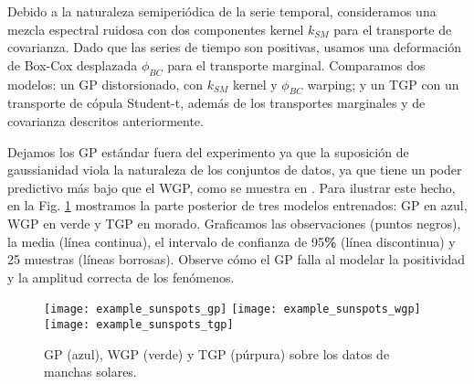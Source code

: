 Debido a la naturaleza semiperiódica de la serie temporal, consideramos una mezcla espectral ruidosa con dos componentes kernel \(k_{SM}\) \cite{wilson2013gaussian} para el transporte de covarianza. Dado que las series de tiempo son positivas, usamos una deformación de Box-Cox desplazada \(\phi_{BC}\) \cite{rios2018learning} para el transporte marginal. Comparamos dos modelos: un GP distorsionado, con \(k_{SM}\) kernel y \(\phi_{BC}\) warping; y un TGP con un transporte de cópula Student-t, además de los transportes marginales y de covarianza descritos anteriormente.

Dejamos los GP estándar fuera del experimento ya que la suposición de gaussianidad viola la naturaleza de los conjuntos de datos, ya que tiene un poder predictivo más bajo que el WGP, como se muestra en \cite{rios2018learning, riostobar2019cwgp}. Para ilustrar este hecho, en la Fig. \ref{fig_sunspots} mostramos la parte posterior de tres modelos entrenados: GP en azul, WGP en verde y TGP en morado. Graficamos las observaciones (puntos negros), la media (línea continua), el intervalo de confianza de 95\textbf{\%} (línea discontinua) y 25 muestras (líneas borrosas). Observe cómo el GP falla al modelar la positividad y la amplitud correcta de los fenómenos.

\begin{figure}
	\centering
	\texttt{[image: example\_sunspots\_gp]}
	\texttt{[image: example\_sunspots\_wgp]}
	\texttt{[image: example\_sunspots\_tgp]}
	\caption{GP (azul), WGP (verde) y TGP (púrpura) sobre los datos de manchas solares.}
	\label{fig_sunspots}
\end{figure}


